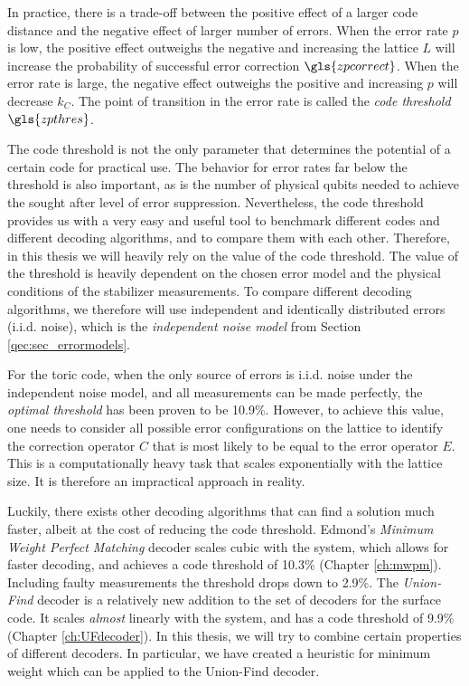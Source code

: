 In practice, there is a trade-off between the positive effect of a larger code distance and the negative effect of larger number of errors. When the error rate $p$ is low, the positive effect outweighs the negative and increasing the lattice $L$ will increase the probability of successful error correction $\gls{zpcorrect}$. When the error rate is large, the negative effect outweighs the positive and increasing $p$ will decrease $k_C$. The point of transition in the error rate is called the \emph{code threshold} $\gls{zpthres}$.

The code threshold is not the only parameter that determines the potential of a certain code for practical use. The behavior for error rates far below the threshold is also important, as is the number of physical qubits needed to achieve the sought after level of error suppression. Nevertheless, the code threshold provides us with a very easy and useful tool to benchmark different codes and different decoding algorithms, and to compare them with each other. Therefore, in this thesis we will heavily rely on the value of the code threshold. The value of the threshold is heavily dependent on the chosen error model and the physical conditions of the stabilizer measurements. To compare different decoding algorithms, we therefore will use independent and identically distributed errors (i.i.d. noise), which is the \emph{independent noise model} from Section \ref{qec:sec_errormodels}.


For the toric code, when the only source of errors is i.i.d. noise under the independent noise model, and all measurements can be made perfectly, the \emph{optimal threshold} has been proven to be 10.9\%. However, to achieve this value, one needs to consider all possible error configurations on the lattice to identify the correction operator $C$ that is most likely to be equal to the error operator $E$. This is a computationally heavy task that scales exponentially with the lattice size. It is therefore an impractical approach in reality.

Luckily, there exists other decoding algorithms that can find a solution much faster, albeit at the cost of reducing the code threshold. Edmond's \emph{Minimum Weight Perfect Matching} decoder scales cubic with the system, which allows for faster decoding, and achieves a code threshold of 10.3\% (Chapter \ref{ch:mwpm}). Including faulty measurements the threshold drops down to 2.9\%. The \emph{Union-Find} decoder is a relatively new addition to the set of decoders for the surface code. It scales \emph{almost} linearly with the system, and has a code threshold of 9.9\% (Chapter \ref{ch:UFdecoder}). In this thesis, we will try to combine certain properties of different decoders. In particular, we have created a heuristic for minimum weight which can be applied to the Union-Find decoder.


